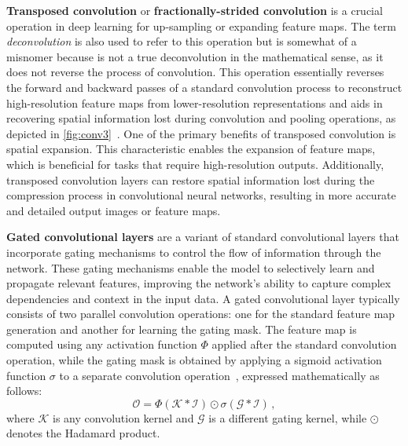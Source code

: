 \textbf{Transposed convolution} or \textbf{fractionally-strided convolution} is a crucial operation in deep learning for up-sampling or expanding feature maps. The term \textit{deconvolution} is also used to refer to this operation but is somewhat of a misnomer because is not a true deconvolution in the mathematical sense, as it does not reverse the process of convolution. This operation essentially reverses the forward and backward passes of a standard convolution process to reconstruct high-resolution feature maps from lower-resolution representations and aids in recovering spatial information lost during convolution and pooling operations, as depicted in \autoref{fig:conv3}~\supercite{deconv}. One of the primary benefits of transposed convolution is spatial expansion. This characteristic enables the expansion of feature maps, which is beneficial for tasks that require high-resolution outputs. Additionally, transposed convolution layers can restore spatial information lost during the compression process in convolutional neural networks, resulting in more accurate and detailed output images or feature maps.

\textbf{Gated convolutional layers} are a variant of standard convolutional layers that incorporate gating mechanisms to control the flow of information through the network. These gating mechanisms enable the model to selectively learn and propagate relevant features, improving the network's ability to capture complex dependencies and context in the input data. A gated convolutional layer typically consists of two parallel convolution operations: one for the standard feature map generation and another for learning the gating mask. The feature map is computed using any activation function $\Phi$ applied after the standard convolution operation, while the gating mask is obtained by applying a sigmoid activation function $\sigma$ to a separate convolution operation~\supercite{free-form-inpainting}, expressed mathematically as follows:
\begin{equation}
    \mathcal{O} = \Phi \left( \mathcal{K} \ast \mathcal{I} \right) \odot \sigma \left( \mathcal{G} * \mathcal{I} \right) \,,
\end{equation}
\noindent where $\mathcal{K}$ is any convolution kernel and $\mathcal{G}$ is a different gating kernel, while $\odot$ denotes the Hadamard product.

